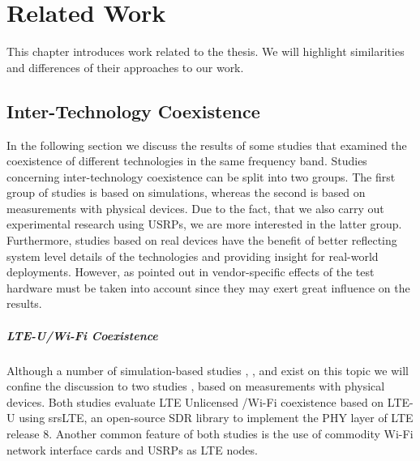 \chapter{Related Work}
\label{ch:related-work}

This chapter introduces work related to the thesis. We will highlight similarities and differences of their approaches to our work. 

\section{Inter-Technology Coexistence}

In the following section we discuss the results of some studies that examined the coexistence of different technologies in the same frequency band. Studies concerning inter-technology coexistence can be split into two groups. The first group of studies is based on simulations, whereas the second is based on measurements with physical devices. Due to the fact, that we also carry out experimental research using USRPs, we are more interested in the latter group. Furthermore, studies based on real devices have the benefit of better reflecting system level details of the technologies and providing insight for real-world deployments. However, as pointed out in \cite{gomezmiguelez16} vendor-specific effects of the test hardware must be taken into account since they may exert great influence on the results. 

\paragraph{LTE-U/Wi-Fi Coexistence}
Although a number of simulation-based studies \cite{nihtilä13}, \cite{rupasinghe14}, \cite{jeon14} and \cite{cavalcante13} exist on this topic we will confine the discussion to two studies \cite{gomezmiguelez16}, \cite{capretti16} based on measurements with physical devices. Both studies evaluate LTE Unlicensed /Wi-Fi coexistence based on LTE-U using srsLTE, an open-source SDR library to implement the PHY layer of LTE release 8. Another common feature of both studies is the use of commodity Wi-Fi network interface cards and USRPs as LTE nodes. 

